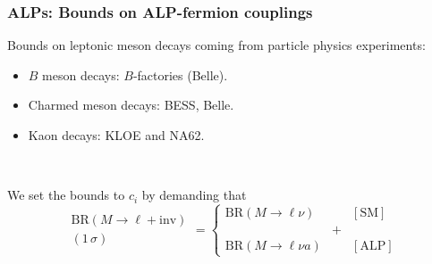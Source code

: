 \documentclass[mathserif, 10pt]{beamer}
\begin{document}
\begin{frame} \frametitle{ALPs: Bounds on ALP-fermion couplings}
    Bounds on leptonic meson decays coming from particle physics experiments:
    \begin{itemize}
        \item $B$ meson decays: $B$-factories (Belle).
        \item Charmed meson decays: BESS, Belle.
        \item Kaon decays: KLOE and NA62.
    \end{itemize}

    ~

    We set the bounds to $c_i$ by demanding that
    $$
        \begin{matrix}
            \mathrm{BR}(M\to \ell + \mathrm{inv}) \\
            (1\,\sigma)
        \end{matrix} = \left\{ \begin{matrix}
            \mathrm{BR}(M\to \ell \nu)   &   & [\mathrm{SM}]  \\
                                         & + &                \\
            \mathrm{BR}(M\to \ell \nu a) &   & [\mathrm{ALP}]
        \end{matrix} \right.
    $$

\end{frame}
\end{document}
